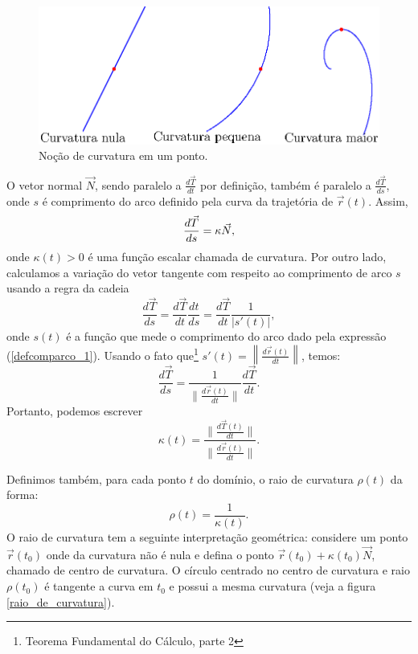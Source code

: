 \begin{figure}
\begin{center}
    \includegraphics{./cap_curvas/figs/exemplos_de_curvatura2}
 \caption{Noção de curvatura em um ponto.\label{curvatura}}
  \end{center}
\end{figure}

O vetor normal $\vec{N}$,  sendo paralelo a $\frac{d\vec{T}}{dt}$ por definição, também é paralelo a $\frac{d\vec{T}}{ds}$, onde $s$ é comprimento do arco definido pela curva da trajetória de $\vec{r}(t)$. Assim, 
\begin{equation}{\label{Frenet_1}}
\frac{d \vec{T} }{ds}=\kappa   \vec{N},
\end{equation}
onde $\kappa(t)>0$ é uma função escalar chamada de curvatura. Por outro lado, calculamos a variação do vetor tangente com respeito ao comprimento de arco $s$ usando a regra da cadeia
$$
\frac{d \vec{T} }{ds}=\frac{d \vec{T} }{dt}\frac{dt}{ds}=\frac{d \vec{T} }{dt}\frac{1}{|s'(t)|},
$$
onde $s(t)$ é a função que mede o comprimento do arco dado pela expressão (\ref{defcomparco_1}). Usando o fato que\footnote{Teorema Fundamental do Cálculo, parte 2} $s'(t)=\left\|\frac{d\vec{r}(t)}{dt}\right\|$, temos:
$$
\frac{d \vec{T} }{ds}=\frac{1}{\|\frac{d\vec{r}(t)}{dt} \|}\frac{d \vec{T} }{dt}.
$$
Portanto, podemos escrever
$$
\kappa(t)=\frac{\|\frac{d\vec{T}(t)}{dt}\|}{\|\frac{d\vec{r}(t)}{dt}\|}.
$$

Definimos também, para cada ponto $t$ do domínio, o raio de curvatura $\rho(t)$ da forma:
$$
\rho(t)=\frac{1}{\kappa(t)}.
$$
O raio de curvatura tem a seguinte interpretação geométrica: considere um ponto $\vec{r}(t_0)$ onde da curvatura não é nula e defina o ponto $\vec{r}(t_0)+\kappa(t_0)\vec{N}$, chamado de centro de curvatura. O círculo centrado no centro de curvatura e raio $\rho(t_0)$ é tangente a curva em $t_0$ e possui a mesma curvatura (veja a figura \ref{raio_de_curvatura}).


